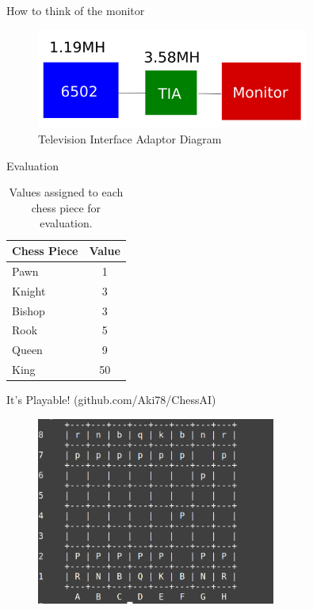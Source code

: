 \documentclass{beamer}
\begin{document}
\begin{frame}{How to think of the monitor}
    \begin{figure}
        \centering
        \includegraphics[width=0.8\textwidth]{TIA_diagram.png} %

        \caption{Television Interface Adaptor Diagram}
    \end{figure}
\end{frame}





\begin{frame}{Evaluation}
\begin{table}[ht]
\centering
\begin{tabular}{|l|c|}
\hline
\textbf{Chess Piece} & \textbf{Value} \\
\hline
Pawn & 1 \\
\hline
Knight & 3 \\
\hline
Bishop & 3 \\
\hline
Rook & 5 \\
\hline
Queen & 9 \\
\hline
King & 50 \\
\hline
\end{tabular}
\caption{Values assigned to each chess piece for evaluation.}
\label{table:chess_piece_values}
\end{table}
\end{frame}

\begin{frame}{It's Playable! (github.com/Aki78/ChessAI)}
    \begin{figure}
        \centering
        \includegraphics[width=0.7\textwidth]{playable.png} %

    \end{figure}
\end{frame}
\end{document}
